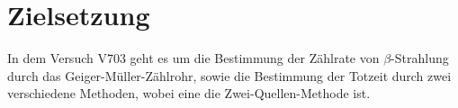 \section{Zielsetzung} 

\begin{flushleft}
    In dem Versuch V703 geht es um die Bestimmung der Zählrate von $\beta$-Strahlung durch das Geiger-Müller-Zählrohr, sowie die Bestimmung der Totzeit durch zwei verschiedene Methoden, wobei eine die Zwei-Quellen-Methode ist.
\end{flushleft}